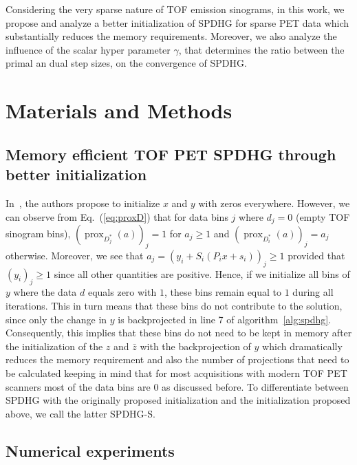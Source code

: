 \documentclass[11pt,twocolumn,twoside]{article}
\DeclareMathOperator{\prox}{prox}
\begin{document}
\smallskip

Considering the very sparse nature of TOF emission sinograms,
in this work, we propose and analyze a better initialization of SPDHG for sparse PET data
which substantially reduces the memory requirements.
Moreover, we also analyze the influence of the scalar hyper parameter $\gamma$, that determines
the ratio between the primal an dual step sizes, on the convergence of SPDHG.




\section{Materials and Methods}

\subsection{Memory efficient TOF PET SPDHG through better initialization}

In~\cite{Ehrhardt2019}, the authors propose to initialize $x$ and $y$ with zeros everywhere.
However, we can observe from Eq.~(\ref{eq:proxD}) that for data bins $j$ where $d_j = 0$ 
(empty TOF sinogram bins), 
$(\prox_{D_j^*}(a))_j = 1$ for $a_j \geq 1$ and $(\prox_{D_i^*}(a))_j = a_j$ otherwise. 
Moreover, we see that $ a_j = (y_i + S_i (P_i x + s_i) )_j \geq 1$ provided that $(y_i)_j \geq 1$ 
since all other quantities are positive. 
Hence, if we initialize all bins of $y$ where the data $d$ equals zero with $1$, 
these bins remain equal to $1$ during all iterations. 
This in turn means that these bins do not contribute to the solution, since only the change
in $y$ is backprojected in line 7 of algorithm~\ref{alg:spdhg}.
Consequently, this implies that these bins do not need to be kept in memory after the initialization
of the $z$ and $\bar{z}$ with the backprojection of $y$ which dramatically reduces the memory
requirement and also the number of projections that need to be calculated keeping in mind that
for most acquisitions with modern TOF PET scanners most of the data bins are 0 as discussed before.
To differentiate between SPDHG with the originally proposed initialization and the initialization proposed
above, we call the latter SPDHG-S.

\subsection{Numerical experiments}
\end{document}
